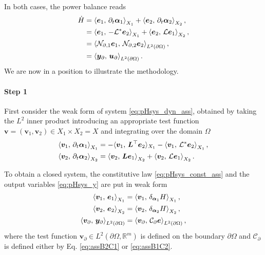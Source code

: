 In both cases, the power balance reads
\begin{equation}\label{eq:powbal_2}
\begin{aligned}
\dot{H} &= \inner[X_1]{\bm{e}_1}{\partial_{t} \bm{\alpha}_1} + \inner[X_2]{\bm{e}_2}{\partial_{t} \bm{\alpha}_2}, \\
&=\inner[X_1]{\bm{e}_1}{-\mathcal{L}^* \bm{e}_2} + \inner[X_2]{\bm{e}_2}{\mathcal{L} \bm{e}_1}, \\
&= \inner[L^2(\partial \Omega)]{\mathcal{N}_{\partial, 1} \bm{e}_1}{\mathcal{N}_{\partial, 2} \bm{e}_2}, \\
&= \inner[L^2(\partial \Omega)]{\bm{y}_\partial}{\bm{u}_\partial}.
\end{aligned}
\end{equation}
We are now in a position to illustrate the methodology. 
\paragraph{Step 1} First consider the weak form of system \eqref{eq:pHsys_dyn_ass}, obtained by taking the $L^2$ inner product introducing an appropriate test function $\bm{v} = (\bm{v}_1, \bm{v}_2) \in X_1 \times X_2 = X$ and integrating over the domain $\Omega$
\begin{equation}\label{eq:weak_dyn}
\begin{aligned}
\inner[X_1]{\bm{v}_1}{\partial_t \bm{\alpha}_1} &= -  \langle{\bm{v}_1},\,{\bm{L}^\top \bm{e}_2}\rangle_{X_1} -  \inner[X_1]{\bm{v}_1}{\mathcal{L}^*\bm{e}_2}, \\
\inner[X_2]{\bm{v}_2}{\partial_t \bm{\alpha}_2} &= \inner[X_2]{\bm{v}_2}{\bm{L}\bm{e}_1}+ \inner[X_2]{\bm{v}_2}{\mathcal{L}\bm{e}_1}.
\end{aligned}
\end{equation}



To obtain a closed system, the constitutive law \eqref{eq:pHsys_const_ass} and the output variables \eqref{eq:pHsys_y} are put in weak form
\begin{equation}
\begin{aligned}
\inner[X_1]{\bm{v}_1}{\bm{e}_1}&= \inner[X_1]{\bm{v}_1}{\delta_{\bm{\alpha}_1} H}, \\
\inner[X_2]{\bm{v}_2}{\bm{e}_2}&= \inner[X_2]{\bm{v}_2}{\delta_{\bm{\alpha}_2} H}, \\
\inner[L^2(\partial \Omega)]{\bm{v}_\partial}{\bm{y}_\partial} &= \inner[L^2(\partial \Omega)]{\bm{v}_\partial}{\mathcal{C}_\partial \bm{e}},
\end{aligned}
\end{equation}
where the test function $\bm{v}_\partial \in L^2(\partial \Omega, \mathbb{R}^m)$ is defined on the boundary $\partial\Omega$ and $\mathcal{C}_\partial$ is defined either by Eq. \eqref{eq:assB2C1} or  \eqref{eq:assB1C2}.


